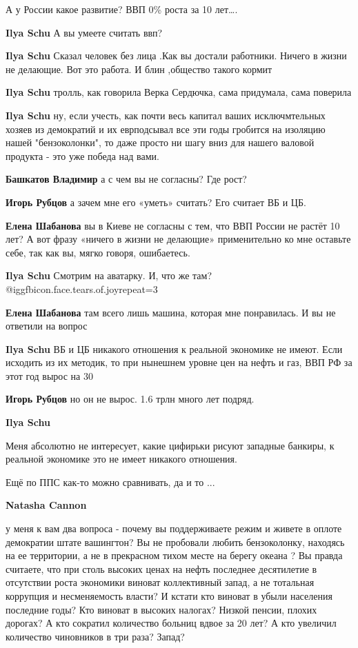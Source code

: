 \begin{itemize}
А у России какое развитие? ВВП 0\% роста за 10 лет….

\begin{itemize} %
\textbf{Ilya Schu}
А вы умеете считать ввп?

\textbf{Ilya Schu} Сказал человек без лица .Как вы достали работники. Ничего в жизни не делающие. Вот это работа. И блин ,общество такого кормит

\textbf{Ilya Schu} тролль, как говорила Верка Сердючка, сама придумала, сама поверила

\textbf{Ilya Schu} ну, если учесть, как почти весь капитал ваших исключмтельных хозяев из демократий и их еврподсывал все эти годы гробится на изоляцию нашей "бензоколонки", то даже просто ни шагу вниз для нашего валовой продукта - это уже победа над вами.

\textbf{Башкатов Владимир} а с чем вы не согласны? Где рост?

\textbf{Игорь Рубцов} а зачем мне его «уметь» считать? Его считает ВБ и ЦБ.

\textbf{Елена Шабанова} вы в Киеве не согласны с тем, что ВВП России не растёт 10 лет? А вот фразу «ничего в жизни не делающие» применительно ко мне оставьте себе, так как вы, мягко говоря, ошибаетесь.

\textbf{Ilya Schu} Смотрим на аватарку. И, что же там? @igg{fbicon.face.tears.of.joy}{repeat=3} 

\textbf{Елена Шабанова} там всего лишь машина, которая мне понравилась. И вы не ответили на вопрос

\textbf{Ilya Schu}
ВБ и ЦБ никакого отношения к реальной экономике не имеют.
Если исходить из их методик, то при нынешнем уровне цен на нефть и газ, ВВП РФ за этот год вырос на 30%

\textbf{Игорь Рубцов} но он не вырос. 1.6 трлн много лет подряд.

\textbf{Ilya Schu}

Меня абсолютно не интересует, какие цифирьки рисуют западные банкиры, к реальной экономике это не имеет никакого отношения.

Ещё по ППС как-то можно сравнивать, да и то ...

\textbf{Natasha Cannon} 

у меня к вам два вопроса - почему вы поддерживаете режим и живете в оплоте
демократии штате вашингтон? Вы не пробовали любить бензоколонку, находясь на ее
территории, а не в прекрасном тихом месте на берегу океана ? Вы правда
считаете, что при столь высоких ценах на нефть последнее десятилетие в
отсутствии роста экономики виноват коллективный запад, а не тотальная коррупция
и несменяемость власти? И кстати кто виноват в убыли населения последние годы?
Кто виноват в высоких налогах? Низкой пенсии, плохих дорогах? А кто сократил
количество больниц вдвое за 20 лет? А кто увеличил количество чиновников в три
раза? Запад?



\end{itemize}
\end{itemize}
